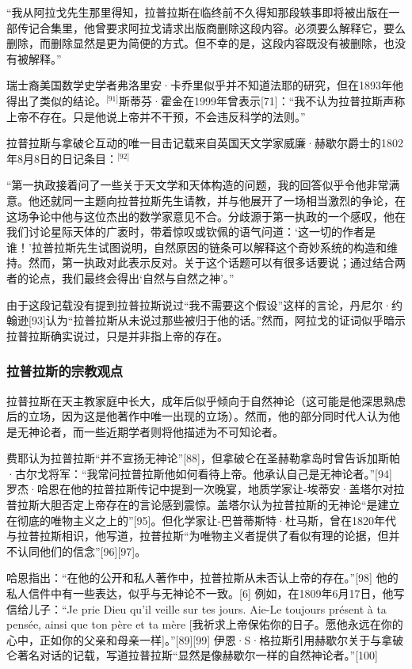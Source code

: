 “我从阿拉戈先生那里得知，拉普拉斯在临终前不久得知那段轶事即将被出版在一部传记合集里，他曾要求阿拉戈请求出版商删除这段内容。必须要么解释它，要么删除，而删除显然是更为简便的方式。但不幸的是，这段内容既没有被删除，也没有被解释。”

瑞士裔美国数学史学者弗洛里安·卡乔里似乎并不知道法耶的研究，但在1893年他得出了类似的结论。\(^\text{[91]}\)斯蒂芬·霍金在1999年曾表示[71]：“我不认为拉普拉斯声称上帝不存在。只是他说上帝并不干预，不会违反科学的法则。”

拉普拉斯与拿破仑互动的唯一目击记载来自英国天文学家威廉·赫歇尔爵士的1802年8月8日的日记条目：\(^\text{[92]}\)

“第一执政接着问了一些关于天文学和天体构造的问题，我的回答似乎令他非常满意。他还就同一主题向拉普拉斯先生请教，并与他展开了一场相当激烈的争论，在这场争论中他与这位杰出的数学家意见不合。分歧源于第一执政的一个感叹，他在我们讨论星际天体的广袤时，带着惊叹或钦佩的语气问道：‘这一切的作者是谁！’拉普拉斯先生试图说明，自然原因的链条可以解释这个奇妙系统的构造和维持。然而，第一执政对此表示反对。关于这个话题可以有很多话要说；通过结合两者的论点，我们最终会得出‘自然与自然之神’。”

由于这段记载没有提到拉普拉斯说过“我不需要这个假设”这样的言论，丹尼尔·约翰逊[93]认为“拉普拉斯从未说过那些被归于他的话。”然而，阿拉戈的证词似乎暗示拉普拉斯确实说过，只是并非指上帝的存在。
\subsubsection{拉普拉斯的宗教观点}
拉普拉斯在天主教家庭中长大，成年后似乎倾向于自然神论（这可能是他深思熟虑后的立场，因为这是他著作中唯一出现的立场）。然而，他的部分同时代人认为他是无神论者，而一些近期学者则将他描述为不可知论者。

费耶认为拉普拉斯“并不宣扬无神论”[88]，但拿破仑在圣赫勒拿岛时曾告诉加斯帕·古尔戈将军：“我常问拉普拉斯他如何看待上帝。他承认自己是无神论者。”[94] 罗杰·哈恩在他的拉普拉斯传记中提到一次晚宴，地质学家让-埃蒂安·盖塔尔对拉普拉斯大胆否定上帝存在的言论感到震惊。盖塔尔认为拉普拉斯的无神论“是建立在彻底的唯物主义之上的”[95]。但化学家让-巴普蒂斯特·杜马斯，曾在1820年代与拉普拉斯相识，他写道，拉普拉斯“为唯物主义者提供了看似有理的论据，但并不认同他们的信念”[96][97]。

哈恩指出：“在他的公开和私人著作中，拉普拉斯从未否认上帝的存在。”[98] 他的私人信件中有一些表达，似乎与无神论不一致。[6] 例如，在1809年6月17日，他写信给儿子：“Je prie Dieu qu'il veille sur tes jours. Aie-Le toujours présent à ta pensée, ainsi que ton père et ta mère [我祈求上帝保佑你的日子。愿他永远在你的心中，正如你的父亲和母亲一样]。”[89][99] 伊恩·S·格拉斯引用赫歇尔关于与拿破仑著名对话的记载，写道拉普拉斯“显然是像赫歇尔一样的自然神论者。”[100]

